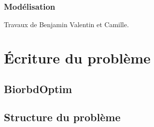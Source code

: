            \subsection{Modélisation}
Travaux de Benjamin Valentin et Camille.
    \chapter{\'Ecriture du problème}
        \section{BiorbdOptim}
        \section{Structure du problème}
% 
% 

